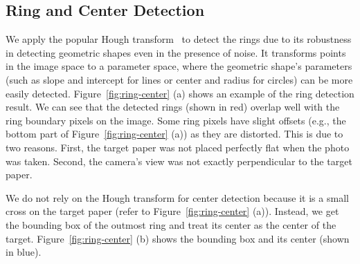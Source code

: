 \documentclass[runningheads]{llncs}
\begin{document}
\subsection{Ring and Center Detection}

We apply the popular Hough transform~\cite{Duda-CACM72} to detect the rings due to its robustness in detecting geometric shapes even in the presence of noise. It transforms points in the image space to a parameter space, where the geometric shape's parameters (such as slope and intercept for lines or center and radius for circles) can be more easily detected. 
%
%
Figure~\ref{fig:ring-center} (a) shows an example of the ring detection result. We can see that the detected rings (shown in red) overlap well with the ring boundary pixels on the image. Some ring pixels have slight offsets (e.g., the bottom part of Figure~\ref{fig:ring-center} (a)) as they are distorted. This is due to two reasons. First, the target paper was not placed perfectly flat when the photo was taken. Second, the camera's view was not exactly perpendicular to the target paper. 

We do not rely on the Hough transform for center detection because it is a small cross on the target paper (refer to Figure~\ref{fig:ring-center} (a)). Instead, we get the bounding box of the outmost ring and treat its center as the center of the target. Figure~\ref{fig:ring-center} (b) shows the bounding box and its center (shown in blue). 
\end{document}
